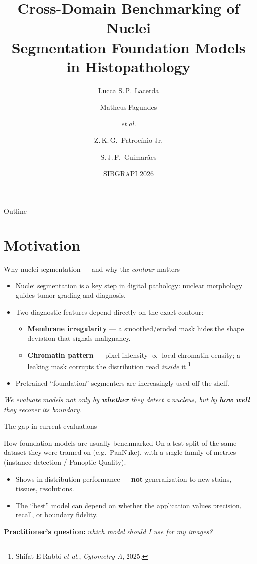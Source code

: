 \documentclass[10pt,aspectratio=169]{beamer}
\title[Cross-Domain Nuclei Segmentation]{Cross-Domain Benchmarking of Nuclei\\Segmentation Foundation Models in Histopathology}
\author[IMScience / PUC Minas]{Lucca S.\,P.\ Lacerda \and Matheus Fagundes \and \emph{et al.} \\ \and Z.\,K.\,G.\ Patroc\'inio Jr. \and S.\,J.\,F.\ Guimar\~aes}
\institute[]{Laboratory of Image and Multimedia Data Science (IMScience)\\Pontifical Catholic University of Minas Gerais}
\date{SIBGRAPI 2026}
\begin{document}
\begin{frame}[plain]
  \titlepage
\end{frame}

\begin{frame}{Outline}
  \tableofcontents
\end{frame}

\section{Motivation}
\begin{frame}{Why nuclei segmentation --- and why the \emph{contour} matters}
  \begin{itemize}
    \item Nuclei segmentation is a key step in digital pathology: nuclear morphology guides tumor grading and diagnosis.
    \item Two diagnostic features depend directly on the \alert{exact contour}:
      \begin{itemize}
        \item \textbf{Membrane irregularity} --- a smoothed/eroded mask hides the shape deviation that signals malignancy.
        \item \textbf{Chromatin pattern} --- pixel intensity $\propto$ local chromatin density; a leaking mask corrupts the distribution read \emph{inside} it.\footnote{Shifat-E-Rabbi \emph{et al.}, \emph{Cytometry A}, 2025.}
      \end{itemize}
    \item Pretrained ``foundation'' segmenters are increasingly used off-the-shelf.
  \end{itemize}
  \vfill
  \centering
  \footnotesize\emph{We evaluate models not only by \textbf{whether} they detect a nucleus, but by \textbf{how well} they recover its boundary.}
\end{frame}

\begin{frame}{The gap in current evaluations}
  \begin{block}{How foundation models are usually benchmarked}
    On a \alert{test split of the same dataset they were trained on} (e.g.\ PanNuke), with a \alert{single family of metrics} (instance detection / Panoptic Quality).
  \end{block}
  \begin{itemize}
    \item Shows in-distribution performance --- \textbf{not} generalization to new stains, tissues, resolutions.
    \item The ``best'' model can depend on whether the application values precision, recall, or boundary fidelity.
  \end{itemize}
  \vfill
  \centering
  \large\textbf{Practitioner's question:} \emph{which model should I use for \underline{my} images?}
\end{frame}
\end{document}
